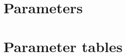 \documentclass[a4paper, 12pt]{article}
\begin{document}
\section{Parameters}

\section{Parameter tables}

\end{document}
